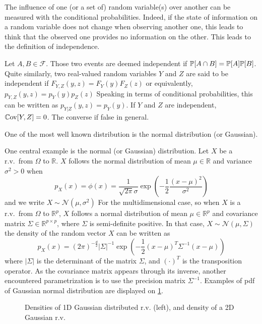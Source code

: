 \documentclass[../../Main_ManuscritThese.tex]{subfiles}
\begin{document}
The influence of one (or a set of) random variable(s) over another can be measured with the conditional probabilities. Indeed, if the state of information on a random variable does not change when observing another one, this leads to think that the observed one provides no information on the other. This leads to the definition of independence.
\begin{definition}[Independence]
  Let $A,B\in \mathcal{F}$. Those two events are deemed independent if $\mathbb{P}[A \cap B] = \mathbb{P}[A]\mathbb{P}[B]$.
  Quite similarly, two real-valued random variables $Y$ and $Z$ are said to be independent if $F_{Y,Z}(y,z) = F_Y(y) F_Z(z)$ or equivalently, $p_{Y,Z}(y,z) = p_Y(y) p_Z(z)$
  Speaking in terms of conditional probabilities, this can be written as $p_{Y|Z}(y,z) = p_{Y}(y)$.
  If $Y$ and $Z$ are independent, $\mathbb{C}\mathrm{ov}[Y, Z] = 0$. The converse if false in general.
\end{definition}
One of the most well known distribution is the normal distribution (or Gaussian).
\begin{example}
  \label{ex:gaussian_distribution}
  One central example is the normal (or Gaussian) distribution. Let $X$ be a r.v.\ from $\Omega$ to $\mathbb{R}$.
  $X$ follows the normal distribution of mean $\mu \in \mathbb{R}$ and variance $\sigma^2>0$ when
  \begin{equation}
    p_X(x) = \phi(x) = \frac{1}{\sqrt{2\pi}\sigma}\exp\left(-\frac{1}{2}\frac{(x-\mu)^2}{\sigma^2}\right)
  \end{equation}
and we write $X \sim \mathcal{N}(\mu,\sigma^2)$
For the multidimensional case, so when $X$ is a r.v.\ from $\Omega$ to $\mathbb{R}^p$,
$X$ follows a normal distribution of mean $\mu \in \mathbb{R}^p$ and covariance matrix $\Sigma \in \mathbb{R}^{p\times p}$, where $\Sigma$ is semi-definite positive.
In that case, $X\sim \mathcal{N}(\mu, \Sigma)$ the density of the random vector $X$ can be written as
\begin{equation}
    p_X(x) = (2\pi)^{-\frac{d}{2}}\lvert\Sigma\rvert^{-1}\exp\left(-\frac{1}{2}(x-\mu)^T\Sigma^{-1}(x-\mu)\right)
  \end{equation}
  where $|\Sigma|$ is the determinant of the matrix $\Sigma$, and $(\cdot)^T$ is the transposition operator.
  As the covariance matrix appears through its inverse, another encountered parametrization is to use the precision matrix $\Sigma^{-1}$.
  Examples of pdf of Gaussian normal distribution are displayed on \cref{fig:example_normal}.
\end{example}
\begin{figure}[!h]
  \centering
  
  \caption{Densities of 1D Gaussian distributed r.v. (left), and density of a 2D Gaussian r.v.}
  \label{fig:example_normal}
\end{figure}
\end{document}

